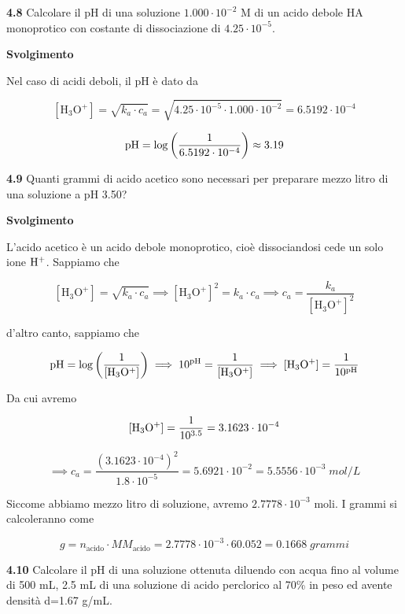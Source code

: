 \vspace{0.2cm}\textbf{4.8} Calcolare il pH di una soluzione $1.000 \cdot 10^{-2}$ M di un acido debole HA monoprotico con costante di dissociazione di $4.25 \cdot  10^{-5}$.

\vspace{0.2cm}\large\textbf{Svolgimento}\normalsize

\vspace{0.2cm}Nel caso di acidi deboli, il pH è dato da

$$[\text{H}_3\text{O}^+] = \sqrt{k_a \cdot c_a}
=\sqrt{4.25 \cdot  10^{-5} \cdot 1.000 \cdot 10^{-2}}=6.5192 \cdot 10^{-4}$$

$$\rm pH=\log{\left(\frac{1}{6.5192 \cdot 10^{-4}}\right)}\approx 3.19$$

\vspace{0.2cm}\textbf{4.9} Quanti grammi di acido acetico sono necessari per preparare mezzo litro di una soluzione a pH 3.50?

\vspace{0.2cm}\large\textbf{Svolgimento}\normalsize

\vspace{0.2cm}L'acido acetico è un acido debole monoprotico, cioè dissociandosi cede un solo ione $\rm H^+$. Sappiamo che

$$[\text{H}_3\text{O}^+] = \sqrt{k_a \cdot c_a}
\implies
[\text{H}_3\text{O}^+]^2 = k_a \cdot c_a
\implies
c_a=\frac{k_a}{[\text{H}_3\text{O}^+]^2}$$

d'altro canto, sappiamo che

$$\rm pH=\log{\left(\frac{1}{[H_3O^+]}\right)}
\implies
10^{pH}=\frac{1}{[H_3O^+]}
\implies
[H_3O^+]=\frac{1}{10^{pH}}$$

Da cui avremo

$$\rm [H_3O^+]=\frac{1}{10^{3.5}}=3.1623 \cdot 10^{-4}$$

$$\implies
c_a=\frac{(3.1623 \cdot 10^{-4})^2}{1.8 \cdot 10^{-5}}=5.6921 \cdot 10^{-2}
=5.5556 \cdot 10^{-3}\;mol/L$$

Siccome abbiamo mezzo litro di soluzione, avremo $2.7778 \cdot 10^{-3}$ moli. I grammi si calcoleranno come

$$g=n_{\text{acido}} \cdot MM_{\text{acido}}
=2.7778 \cdot 10^{-3} \cdot 60.052=0.1668\;grammi$$

\vspace{0.2cm}\textbf{4.10} Calcolare il pH di una soluzione ottenuta diluendo con acqua fino al volume di 500 mL, 2.5 mL
di una soluzione di acido perclorico al 70\% in peso ed avente densità d=1.67 g/mL.

